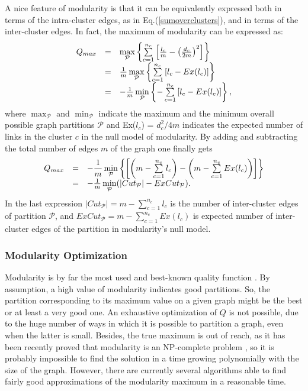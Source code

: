 A nice feature of modularity is that it can be equivalently expressed both in terms of the intra-cluster edges, as in Eq.(\ref{sumoverclusters}), and in terms of the inter-cluster edges. In fact, the maximum of modularity can be expressed as:
\begin{equation}\label{modularity_Q_max}
\begin{array}{c c lc}
Q_{max} & = & \max\limits_{\mathcal{P}} \left\lbrace \sum\limits_{c=1}^{n_{c}}\left[\frac{l_{c}}{m} - \left(\frac{d_{c}}{2m}\right)^2\right]\right\rbrace \\
& = & \frac{1}{m}\max\limits_{\mathcal{P}} \left\lbrace \sum\limits_{c=1}^{n_{c}}\left[l_{c} - Ex(l_{c})\right] \right\rbrace \\
& = & - \frac{1}{m}\min\limits_{\mathcal{P}} \left\lbrace - \sum\limits_{c=1}^{n_{c}}\left[l_{c} - Ex(l_{c})\right] \right\rbrace,
\end{array}
\end{equation}
where $\max_{\mathcal{P}}$ and $\min_{\mathcal{P}}$ indicate the maximum and the minimum overall possible graph partitions $\mathcal{P}$ and Ex($l_c$) = $d_c^2/4m$ indicates the expected number of links in the cluster $c$ in the null model of modularity. By adding and subtracting the total number of edges $m$ of the graph one finally gets
\begin{equation}\label{modularity_Q_max_cut}
\begin{array}{c c lc}
Q_{max} & = & -\dfrac{1}{m} \min\limits_{\mathcal{P}}\left\lbrace \left[ \left( m - \sum\limits_{c=1}^{n_c} l_c\right) - \left( m - \sum\limits_{c=1}^{n_c} Ex(l_c)\right) \right] \right \rbrace \\
& = & - \frac{1}{m} \min\limits_{\mathcal{P}} (\vert Cut_{\mathcal{P}} \vert - ExCut_{\mathcal{P}}).
\end{array}
\end{equation}
In the last expression $\vert Cut_{\mathcal{P}} \vert = m - \sum_{c=1}^{n_c} l_c$ is the number of inter-cluster edges of partition $\mathcal{P}$, and $ExCut_{\mathcal{P}} = m - \sum_{c=1}^{n_c} Ex(l_c)$ is expected number of inter-cluster edges of the partition in modularity's null model.

\subsubsection*{Modularity Optimization }\label{sebsec:modularity-optimization}
Modularity is by far the most used and best-known quality function \cite{ref-6}. By assumption, a high value of modularity indicates good partitions. So, the partition corresponding to its maximum value on a given graph might be the best or at least a very good one. An exhaustive optimization of $Q$ is not possible, due to the huge number of ways in which it is possible to partition a graph, even when the latter is small. Besides, the true maximum is out of reach, as it has been recently proved that modularity is an NP-complete problem \cite{ref-18}, so it is probably impossible to find the solution in a time growing polynomially with the size of the graph. However, there are currently several algorithms able to find fairly good approximations of the modularity maximum in a reasonable time.


